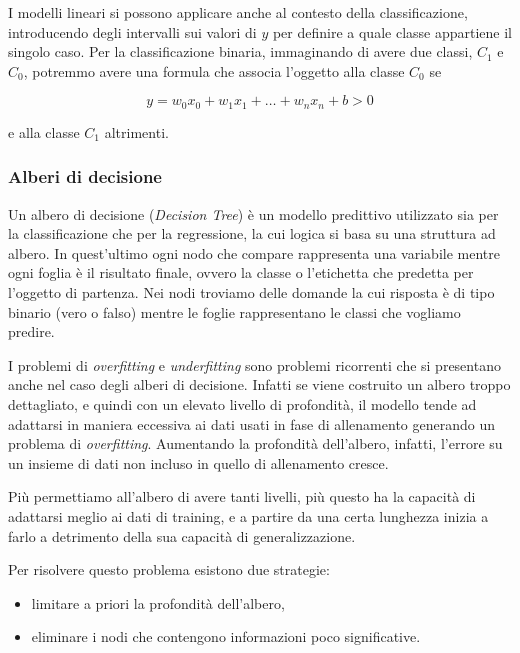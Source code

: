 \documentclass[a4paper,12pt]{report}
\begin{document}
I modelli lineari si possono applicare anche al contesto della classificazione, introducendo degli intervalli sui valori di $y$ per definire a quale classe appartiene il singolo caso. 
Per la classificazione binaria, immaginando di avere due classi, $C_1$ e $C_0$, potremmo avere una formula che associa l'oggetto alla classe $C_0$ se

\begin{equation*}
    y = w_0x_0 + w_1x_1 + \dots + w_nx_n + b > 0
\end{equation*}

\noindent e alla classe $C_1$ altrimenti.


\subsubsection{Alberi di decisione}

Un albero di decisione (\textit{Decision Tree}) è un modello predittivo utilizzato sia per la classificazione che per la regressione, la cui logica si basa su una struttura ad albero. In quest'ultimo ogni nodo che compare rappresenta una variabile mentre ogni foglia è il risultato finale, ovvero la classe o l'etichetta che predetta per l'oggetto di partenza.
Nei nodi troviamo delle domande la cui risposta è di tipo binario (vero o falso) mentre le foglie rappresentano le classi che vogliamo predire.

I problemi di \textit{overfitting} e \textit{underfitting} sono problemi ricorrenti che si presentano anche nel caso degli alberi di decisione. Infatti se viene costruito un albero troppo dettagliato, e quindi con un elevato livello di profondità, il modello tende ad adattarsi in maniera eccessiva ai dati usati in fase di allenamento generando un problema di \textit{overfitting}.
Aumentando la profondità dell'albero, infatti, l'errore su un insieme di dati non incluso in quello di allenamento cresce.

Più permettiamo all’albero di avere tanti livelli, più questo ha la capacità di adattarsi meglio ai dati di training, e a partire da una certa lunghezza inizia a farlo a detrimento della sua capacità di generalizzazione. 

Per risolvere questo problema esistono due strategie:
\begin{itemize}
    \item limitare a priori la profondità dell'albero, 
    \item eliminare i nodi che contengono informazioni poco significative.
\end{itemize}
\end{document}
